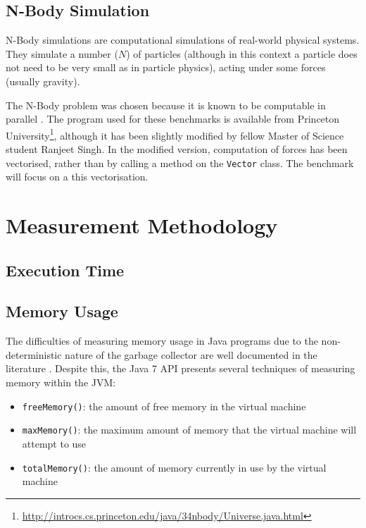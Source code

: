 	\subsection{N-Body Simulation} \label{sec:methodology/benchmarks/nbody}
	N-Body simulations \citep{Trenti2008} are computational simulations of real-world physical systems. They simulate a number ($N$) of particles (although in this context a particle does not need to be very small as in particle physics), acting under some forces (usually gravity).
	
	The N-Body problem was chosen because it is known to be computable in parallel \citep{Warren1993,Nyland2007}. The program used for these benchmarks is available from Princeton University\footnote{\url{http://introcs.cs.princeton.edu/java/34nbody/Universe.java.html}}, although it has been slightly modified by fellow Master of Science student Ranjeet Singh. In the modified version, computation of forces has been vectorised, rather than by calling a method on the \texttt{Vector} class. The benchmark will focus on a this vectorisation.
	
\section{Measurement Methodology} \label{sec:methodology/measurements}
	\subsection{Execution Time} \label{sec:methodology/measurements/time}
	
	\subsection{Memory Usage} \label{sec:methodology/measurements/memory}
	The difficulties of measuring memory usage in Java programs due to the non-deterministic nature of the garbage collector are well documented in the literature \citep{Kim2000,Ogata2010}. Despite this, the Java 7 API presents several techniques \citep{RuntimeDocs} of measuring memory within the JVM:
	
	\begin{itemize}
		\item \texttt{freeMemory()}: the amount of free memory in the virtual machine
		\item \texttt{maxMemory()}: the maximum amount of memory that the virtual machine will attempt to use
		\item \texttt{totalMemory()}: the amount of memory currently in use by the virtual machine
	\end{itemize}
